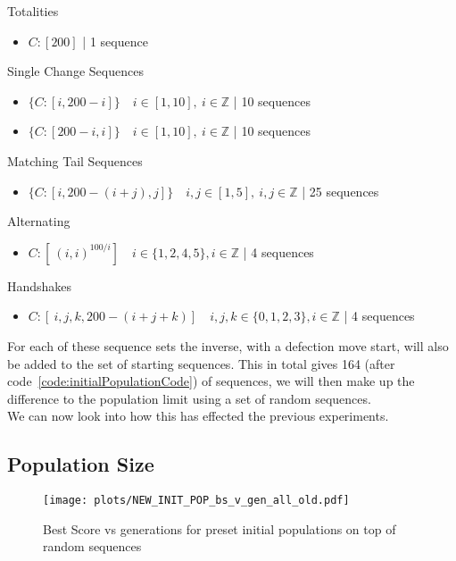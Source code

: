 Totalities
\begin{itemize}
    \item \(C:[200]\) | 1 sequence
\end{itemize}

Single Change Sequences
\begin{itemize}
    \item \(\{C:[i,200-i]\} \quad i\in [1,10],\ i \in \mathbb{Z}\) | 10 sequences
    \item \(\{C:[200-i,i]\} \quad i\in [1,10],\ i \in \mathbb{Z}\) | 10 sequences
\end{itemize}

Matching Tail Sequences
\begin{itemize}
    \item \(\{C:[i,200-(i+j),j]\} \quad i,j \in [1,5],\ i,j \in \mathbb{Z}\) | 25 sequences
\end{itemize}

Alternating
\begin{itemize}
    \item \(C:[\ (i,i)^{100/i}] \quad i \in \{1,2,4,5\}, i \in \mathbb{Z}\) | 4 sequences
\end{itemize}

Handshakes
\begin{itemize}
    \item \(C:[\ i,j,k,200-(i+j+k)] \quad i,j,k \in \{0,1,2,3\}, i \in \mathbb{Z}\) | 4 sequences
\end{itemize}

For each of these sequence sets the inverse, with a defection move start, will also be added to the set of starting sequences.
This in total gives 164 (after code~\ref{code:initialPopulationCode}) of sequences, we will then make up the difference to the population limit using a set of random sequences.\\

We can now look into how this has effected the previous experiments.

\subsection{Population Size}\label{subsec:populationSize}

\begin{figure}[h]
    \texttt{[image: plots/NEW\_INIT\_POP\_bs\_v\_gen\_all\_old.pdf]}
    \caption{Best Score vs generations for preset initial populations on top of random sequences}\label{fig:NEW-INIT-POP-bs-v-gen-all}
\end{figure}

